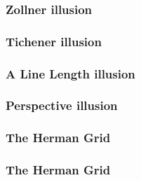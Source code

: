\documentclass[12pt]{beamer}\usepackage[]{graphicx}\usepackage[]{color}
\begin{document}

\begin{frame}
\frametitle{Zollner illusion}
\begin{center}
\end{center}
\end{frame}


\begin{frame}
\frametitle{Tichener illusion}
\begin{center}
\end{center}
\end{frame}


\begin{frame}
\frametitle{A Line Length illusion}
\begin{center}
\end{center}
\end{frame}


\begin{frame}
\frametitle{Perspective illusion}
\begin{center}
\end{center}
\end{frame}


\begin{frame}
\frametitle{The Herman Grid}
\begin{center}
\end{center}
\end{frame}


\begin{frame}
\frametitle{The Herman Grid}
\begin{center}
\end{center}
\end{frame}

\end{document}
